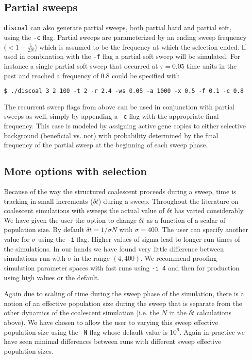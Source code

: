 \documentclass[12pt]{article}
\begin{document}
\subsection*{Partial sweeps}
\texttt{discoal} can also generate partial sweeps, both partial hard and partial soft, using the \texttt{-c} flag. Partial sweeps are parameterized by an ending sweep frequency ($< 1-\frac{1}{2N}$) which is assumed to be the frequency at which the selection ended. If used in combination with the \texttt{-f} flag a partial soft sweep will be simulated. For instance a single partial soft sweep that occurred at $\tau=0.05$ time units in the past and reached a frequency of $0.8$ could be specified with
\begin{verbatim}
$ ./discoal 3 2 100 -t 2 -r 2.4 -ws 0.05 -a 1000 -x 0.5 -f 0.1 -c 0.8
\end{verbatim}

The recurrent sweep flags from above can be used in conjunction with partial sweeps as well, simply by appending a \texttt{-c} flag with the appropriate final frequency. This case is modeled by assigning active gene copies to either selective background (beneficial vs. not) with probability determined by the final frequency of the partial sweep at the beginning of each sweep phase. 


\subsection*{More options with selection}
Because of the way the structured coalescent proceeds during a sweep, time is tracking in small increments ($\delta t$) during a sweep. Throughout the literature on coalescent simulations with sweeps the actual value of $\delta t$ has varied considerably. We have given the user the option to change $\delta t$ as a function of a scalar of population size. By default $\delta t = 1/\sigma N$ with $\sigma=400$. The user can specify another value for $\sigma$ using the \texttt{-i} flag. Higher values of sigma lead to longer run times of the simulations. In our hands we have found very little difference between simulations run with $\sigma$ in the range $(4,400)$. We recommend proofing simulation parameter spaces with fast runs using \texttt{-i 4} and then for production using high values or the default.  

Again due to scaling of time during the sweep phase of the simulation, there is a notion of an effective population size during the sweep that is separate from the other dynamics of the coalescent simulation (i.e. the $N$ in the $\delta t$ calculations above). We have chosen to allow the user to varying this sweep effective population size using the \texttt{-N} flag whose default value is $10^6$. Again in practice we have seen minimal differences between runs with different sweep effective population sizes. 
   
\end{document}
